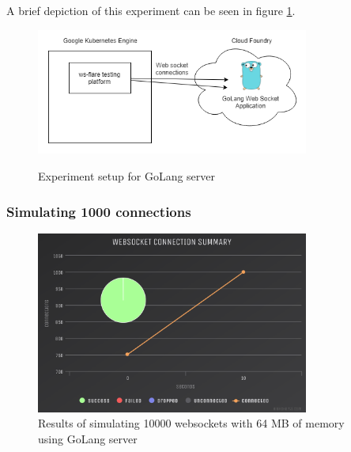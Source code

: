 A brief depiction of this experiment can be seen in figure \ref{fig:experiment-1-vis-golang}.

\begin{figure}[H]
  \centering
  \caption{Experiment setup for GoLang server}
    \includegraphics[width=0.8\textwidth]{figures/experiments/experiment-vis-golang.png}
    \label{fig:experiment-1-vis-golang}
\end{figure}

\subsubsection{Simulating 1000 connections}

\begin{table}[H]
\caption{Cloud Foundry Resource Limits}
\label{table:cf-resource-golang-1000-64}
\end{table}

\begin{figure}[H]
  \centering
    \includegraphics[width=0.8\textwidth]{figures/experiments/experiment-1/golang/conn-1000-64-memory.png}
    \caption{Results of simulating 10000 websockets with 64 MB of memory using GoLang server}
    \label{fig:experiment-1-golang-conn-1000-64}
\end{figure}

